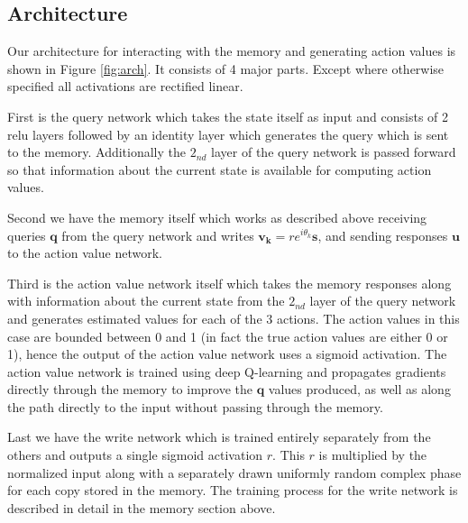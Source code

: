 \documentclass{article}
\begin{document}
\subsection*{Architecture}
Our architecture for interacting with the memory and generating action values is shown in Figure \ref{fig:arch}. It consists of 4 major parts. Except where otherwise specified all activations are rectified linear.

First is the query network which takes the state itself as input and consists of 2 relu layers followed by an identity layer which generates the query which is sent to the memory. Additionally the $2_{nd}$ layer of the query network is passed forward so that information about the current state is available for computing action values. 

Second we have the memory itself which works as described above receiving queries $\pmb{q}$ from the query network and writes $\pmb{v_k}=re^{i\theta_k}\pmb{s}$, and sending responses $\pmb{u}$ to the action value network.

Third is the action value network itself which takes the memory responses along with information about the current state from the $2_{nd}$ layer of the query network and generates estimated values for each of the 3 actions. The action values in this case are bounded between 0 and 1 (in fact the true action values are either 0 or 1), hence the output of the action value network uses a sigmoid activation. The action value network is trained using deep Q-learning and propagates gradients directly through the memory to improve the $\pmb{q}$ values produced, as well as along the path directly to the input without passing through the memory.

Last we have the write network which is trained entirely separately from the others and outputs a single sigmoid activation $r$. This $r$ is multiplied by the normalized input along with a separately drawn uniformly random complex phase for each copy stored in the memory. The training process for the write network is described in detail in the memory section above.
\end{document}

